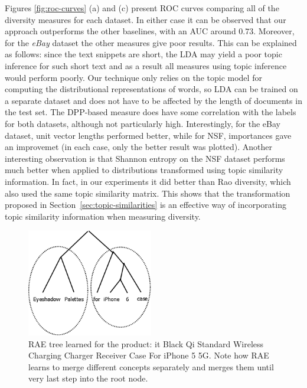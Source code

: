 Figures \ref{fig:roc-curves} (a) and (c)
present ROC curves comparing all of the diversity measures for each dataset.
In either case it can be observed
that our approach outperforms the other baselines, with an AUC
around $0.73$. Moreover, for the {\em eBay} dataset the other measures
give poor results. This can be explained as follows: since the
text snippets are short, the LDA may yield a poor topic inference for
such short text and as a result all measures using topic inference
would perform poorly. Our technique only relies on the topic model for
computing the distributional representations of words, so LDA can be
trained on a separate dataset and does not have to be affected by the
length of documents in the test set.
 The DPP-based measure does have some correlation
with the labels for both datasets, although not particularly
high. Interestingly, for the eBay dataset, unit vector lengths
performed better, while for NSF, importances gave an improvemet (in
each case, only the better result was
plotted). Another interesting observation is that 
Shannon entropy on the NSF dataset performs much better when applied
to distributions transformed using topic similarity information. In
fact, in our experiments it did better than Rao diversity, which also
used the same topic similarity matrix. This shows that the
transformation proposed in Section~\ref{sec:topic-similarities} is an
effective way of incorporating topic similarity information when
measuring diversity.
\begin{figure}
\begin{center}
\includegraphics[width=5.5cm]{figures/RAE.png}
\caption{RAE tree learned for the product: {it Black Qi Standard Wireless Charging Charger Receiver Case For iPhone 5 5G}. Note how RAE learns to merge different concepts separately and merges them until very last step into the root node.}
\end{center}
\label{fig:rae-example}
\end{figure}

